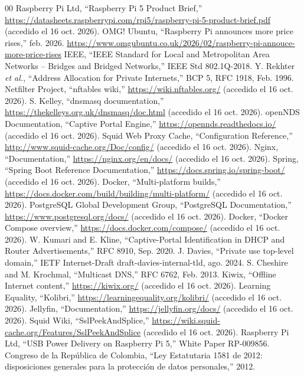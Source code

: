 \documentclass[conference]{IEEEtran}
\begin{document}
\begin{thebibliography}{00}
 Raspberry Pi Ltd, ``Raspberry Pi 5 Product Brief,'' \url{https://datasheets.raspberrypi.com/rpi5/raspberry-pi-5-product-brief.pdf} (accedido el 16 oct. 2026).
 OMG! Ubuntu, ``Raspberry Pi announces more price rises,'' feb. 2026. \url{https://www.omgubuntu.co.uk/2026/02/raspberry-pi-annouce-more-price-rises}
 IEEE, ``IEEE Standard for Local and Metropolitan Area Networks -- Bridges and Bridged Networks,'' IEEE Std 802.1Q-2018.
 Y. Rekhter \textit{et al.}, ``Address Allocation for Private Internets,'' BCP 5, RFC 1918, Feb. 1996.
 Netfilter Project, ``nftables wiki,'' \url{https://wiki.nftables.org/} (accedido el 16 oct. 2026).
 S. Kelley, ``dnsmasq documentation,'' \url{https://thekelleys.org.uk/dnsmasq/doc.html} (accedido el 16 oct. 2026).
 openNDS Documentation, ``Captive Portal Engine,'' \url{https://opennds.readthedocs.io/} (accedido el 16 oct. 2026).
 Squid Web Proxy Cache, ``Configuration Reference,'' \url{http://www.squid-cache.org/Doc/config/} (accedido el 16 oct. 2026).
 Nginx, ``Documentation,'' \url{https://nginx.org/en/docs/} (accedido el 16 oct. 2026).
 Spring, ``Spring Boot Reference Documentation,'' \url{https://docs.spring.io/spring-boot/} (accedido el 16 oct. 2026).
 Docker, ``Multi-platform builds,'' \url{https://docs.docker.com/build/building/multi-platform/} (accedido el 16 oct. 2026).
 PostgreSQL Global Development Group, ``PostgreSQL Documentation,'' \url{https://www.postgresql.org/docs/} (accedido el 16 oct. 2026).
 Docker, ``Docker Compose overview,'' \url{https://docs.docker.com/compose/} (accedido el 16 oct. 2026).
 W. Kumari and E. Kline, ``Captive-Portal Identification in DHCP and Router Advertisements,'' RFC 8910, Sep. 2020.
 J. Davies, ``Private use top-level domain,'' IETF Internet-Draft draft-davies-internal-tld, ago. 2024.
 S. Cheshire and M. Krochmal, ``Multicast DNS,'' RFC 6762, Feb. 2013.
 Kiwix, ``Offline Internet content,'' \url{https://kiwix.org/} (accedido el 16 oct. 2026).
 Learning Equality, ``Kolibri,'' \url{https://learningequality.org/kolibri/} (accedido el 16 oct. 2026).
 Jellyfin, ``Documentation,'' \url{https://jellyfin.org/docs/} (accedido el 16 oct. 2026).
 Squid Wiki, ``SslPeekAndSplice,'' \url{https://wiki.squid-cache.org/Features/SslPeekAndSplice} (accedido el 16 oct. 2026).
 Raspberry Pi Ltd, ``USB Power Delivery on Raspberry Pi 5,'' White Paper RP-009856.
 Congreso de la República de Colombia, ``Ley Estatutaria 1581 de 2012: disposiciones generales para la protección de datos personales,'' 2012.
\end{thebibliography}
\end{document}
